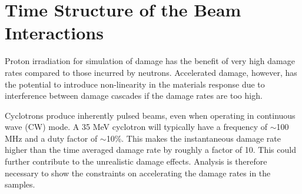 \documentclass[final,3p,times,twocolumn]{elsarticle} %
\begin{document}
\section{Time Structure of the Beam Interactions} 

Proton irradiation for simulation of damage has the benefit of very high damage rates compared to those incurred by neutrons.  Accelerated damage, however, has the potential to introduce non-linearity in the materials response due to interference between damage cascades if the damage rates are too high. 

Cyclotrons produce inherently pulsed beams, even when operating in continuous wave (CW) mode.  A 35 MeV cyclotron will typically have a frequency of $\sim$100 MHz and a duty factor of $\sim$10\%.  This makes the instantaneous damage rate higher than the time averaged damage rate by roughly a factor of 10. This could further contribute to the unrealistic damage effects.  Analysis is therefore necessary to show the constraints on  accelerating the damage rates in the samples. 


\end{document}
